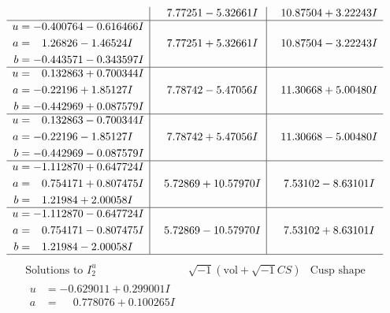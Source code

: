 \documentclass[1p]{elsarticle_modified}
\theoremstyle{definition}
\newcommand{\I}{\sqrt{-1}}
\begin{document}
$$\begin{array}{c|c|c}
 & \phantom{-}7.77251 - 5.32661 I & \phantom{-}10.87504 + 3.22243 I \\ \hline\begin{aligned}
u &= -0.400764 - 0.616466 I \\
a &= \phantom{-}1.26826 - 1.46524 I \\
b &= -0.443571 - 0.343597 I\end{aligned}
 & \phantom{-}7.77251 + 5.32661 I & \phantom{-}10.87504 - 3.22243 I \\ \hline\begin{aligned}
u &= \phantom{-}0.132863 + 0.700344 I \\
a &= -0.22196 + 1.85127 I \\
b &= -0.442969 + 0.087579 I\end{aligned}
 & \phantom{-}7.78742 - 5.47056 I & \phantom{-}11.30668 + 5.00480 I \\ \hline\begin{aligned}
u &= \phantom{-}0.132863 - 0.700344 I \\
a &= -0.22196 - 1.85127 I \\
b &= -0.442969 - 0.087579 I\end{aligned}
 & \phantom{-}7.78742 + 5.47056 I & \phantom{-}11.30668 - 5.00480 I \\ \hline\begin{aligned}
u &= -1.112870 + 0.647724 I \\
a &= \phantom{-}0.754171 + 0.807475 I \\
b &= \phantom{-}1.21984 + 2.00058 I\end{aligned}
 & \phantom{-}5.72869 + 10.57970 I & \phantom{-}7.53102 - 8.63101 I \\ \hline\begin{aligned}
u &= -1.112870 - 0.647724 I \\
a &= \phantom{-}0.754171 - 0.807475 I \\
b &= \phantom{-}1.21984 - 2.00058 I\end{aligned}
 & \phantom{-}5.72869 - 10.57970 I & \phantom{-}7.53102 + 8.63101 I\\
 \hline 
 \end{array}$$\newpage$$\begin{array}{c|c|c}  
\text{Solutions to }I^u_{2}& \I (\text{vol} + \sqrt{-1}CS) & \text{Cusp shape}\\
 \hline 
\begin{aligned}
u &= -0.629011 + 0.299001 I \\
a &= \phantom{-}0.778076 + 0.100265 I \\

\end{aligned}
\end{array}$$
\end{document}
